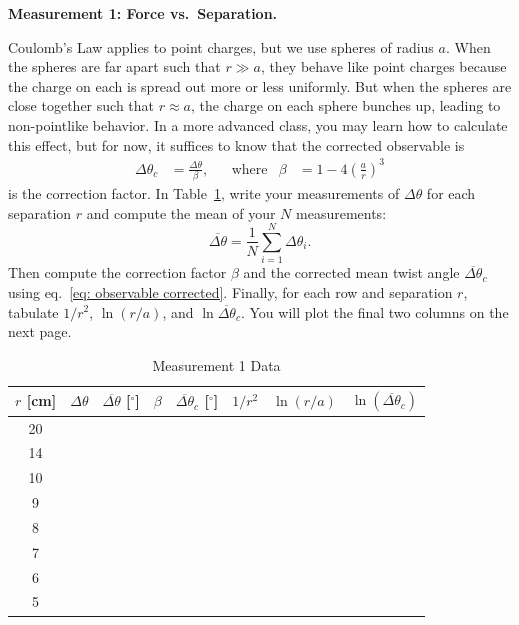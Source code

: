 \documentclass[addpoints]{physlabs}
\begin{document}
\begin{postlab}

\question[4] \textbf{Measurement 1: Force vs.\ Separation.}

Coulomb's Law applies to point charges, but we use spheres of radius $a$. When the spheres are far apart such that $r\gg a$, they behave like point charges because the charge on each is spread out more or less uniformly. But when the spheres are close together such that $r\approx a$, the charge on each sphere bunches up, leading to non-pointlike behavior. In a more advanced class, you may learn how to calculate this effect, but for now, it suffices to know that the corrected observable is
%
\begin{align}\label{eq: observable corrected}
    \Delta \theta_c &= \frac{\Delta \theta}{\beta}, &
    &\text{where} &
    \beta &= 1-4\left(\frac{a}{r}\right)^3
\end{align}
%
is the correction factor. In Table~\ref{tab: measurement 1 data}, write your measurements of $\Delta\theta$ for each separation $r$ and compute the mean of your $N$ measurements:
%
\begin{equation}\label{eq: mean angle}
    \overline{\Delta\theta} = \frac{1}{N}\sum_{i=1}^N \Delta\theta_i.
\end{equation}
%
Then compute the correction factor $\beta$ and the corrected mean twist angle $\overline{\Delta\theta}_c$ using eq.~\ref{eq: observable corrected}. Finally, for each row and separation $r$, tabulate $1/r^2$, $\ln{(r/a)}$, and $\ln{\overline{\Delta\theta}_c}$. You will plot the final two columns on the next page.

\begin{table}[ht]
    \captionsetup{font=normalsize, textfont=bf}
    \centering
    \caption{Measurement 1 Data}
    \renewcommand{\arraystretch}{2.0}
    \begin{tabular}{|c|>{\centering}p{4.5cm}|>{\centering}p{1.2cm}|>{\centering}p{1cm}|>{\centering}p{1.2cm}|>{\centering}p{1cm}|>{\centering}p{1.2cm}|c|}
        \hline
        \rowcolor{EverButter}
        $r$ [cm] & $\Delta\theta$ & $\overline{\Delta\theta}$ [$^\circ$] & $\beta$ & $\overline{\Delta\theta}_c$ [$^\circ$] & $1/r^2$ & $\ln{(r/a)}$ & $\ln{(\overline{\Delta\theta}_c)}$
        \\
        \hline
        20 & & & & & & &
        \\
        \hline
        14 & & & & & & &
        \\
        \hline
        10 & & & & & & &
        \\
        \hline
        9 & & & & & & &
        \\
        \hline
        8 & & & & & & &
        \\
        \hline
        7 & & & & & & &
        \\
        \hline
        6 & & & & & & &
        \\
        \hline
        5 & & & & & & &
        \\
        \hline
    \end{tabular}
    \renewcommand{\arraystretch}{1.0}
    \label{tab: measurement 1 data}
\end{table}


\end{postlab}
\end{document}
